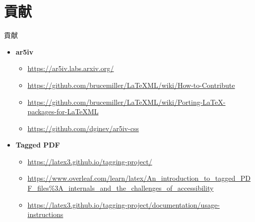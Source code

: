 \documentclass[lualatex,aspectratio=169]{beamer}
\begin{document}
\section{貢献}

\begin{frame}[t]{貢献}
    \begin{itemize}
        \item \textbf{ar5iv}
        \begin{itemize}
            \item {\tiny \url{https://ar5iv.labs.arxiv.org/}}
            \item {\tiny \url{https://github.com/brucemiller/LaTeXML/wiki/How-to-Contribute}}
            \item {\tiny \url{https://github.com/brucemiller/LaTeXML/wiki/Porting-LaTeX-packages-for-LaTeXML}}
            \item {\tiny \url{https://github.com/dginev/ar5iv-css}}
        \end{itemize}
        \item \textbf{Tagged PDF}
        \begin{itemize}
            \item {\tiny \url{https://latex3.github.io/tagging-project/}}
            \item {\tiny \url{https://www.overleaf.com/learn/latex/An_introduction_to_tagged_PDF_files\%3A_internals_and_the_challenges_of_accessibility}}
            \item {\tiny \url{https://latex3.github.io/tagging-project/documentation/usage-instructions}}
        \end{itemize}
    \end{itemize}
\end{frame}
\end{document}
